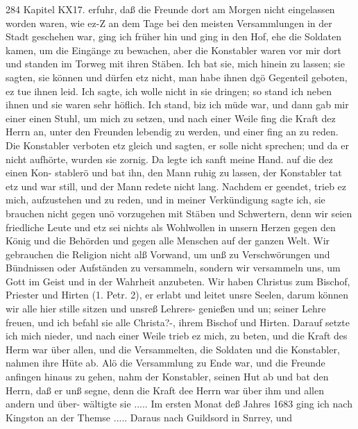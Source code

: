 284 Kapitel KX17.
erfuhr, daß die Freunde dort am Morgen nicht eingelassen worden
waren, wie ez-Z an dem Tage bei den meisten Versammlungen in
der Stadt geschehen war, ging ich früher hin und ging in den
Hof, ehe die Soldaten kamen, um die Eingänge zu bewachen,
aber die Konstabler waren vor mir dort und standen im Torweg
mit ihren Stäben. Ich bat sie, mich hinein zu lassen; sie sagten,
sie können und dürfen etz nicht, man habe ihnen dgö Gegenteil
geboten, ez tue ihnen leid. Ich sagte, ich wolle nicht in sie
dringen; so stand ich neben ihnen und sie waren sehr höflich.
Ich stand, biz ich müde war, und dann gab mir einer einen
Stuhl, um mich zu setzen, und nach einer Weile fing die Kraft
dez Herrn an, unter den Freunden lebendig zu werden, und
einer fing an zu reden. Die Konstabler verboten etz gleich und
sagten, er solle nicht sprechen; und da er nicht aufhörte, wurden
sie zornig. Da legte ich sanft meine Hand. auf die dez einen Kon-
stablerö und bat ihn, den Mann ruhig zu lassen, der Konstabler tat
etz und war still, und der Mann redete nicht lang. Nachdem er
geendet, trieb ez mich, aufzustehen und zu reden, und in meiner
Verkündigung sagte ich, sie brauchen nicht gegen unö vorzugehen
mit Stäben und Schwertern, denn wir seien friedliche Leute und
etz sei nichts als Wohlwollen in unsern Herzen gegen den König
und die Behörden und gegen alle Menschen auf der ganzen Welt.
Wir gebrauchen die Religion nicht alß Vorwand, um unß zu
Verschwörungen und Bündnissen oder Aufständen zu versammeln,
sondern wir versammeln uns, um Gott im Geist und in der
Wahrheit anzubeten. Wir haben Christus zum Bischof, Priester
und Hirten (1. Petr. 2), er erlabt und leitet unsre Seelen, darum
können wir alle hier stille sitzen und unsreß Lehrers- genießen und
un; seiner Lehre freuen, und ich befahl sie alle Christa?-, ihrem
Bischof und Hirten. Darauf setzte ich mich nieder, und nach einer
Weile trieb ez mich, zu beten, und die Kraft des Herm war über
allen, und die Versammelten, die Soldaten und die Konstabler,
nahmen ihre Hüte ab. Alö die Versammlung zu Ende war, und
die Freunde anfingen hinaus zu gehen, nahm der Konstabler,
seinen Hut ab und bat den Herrn, daß er unß segne, denn die
Kraft dee Herrn war über ihm und allen andern und über-
wältigte sie .....
Im ersten Monat deß Jahres 1683 ging ich nach Kingston
an der Themse ..... Daraus nach Guildsord in Snrrey, und



